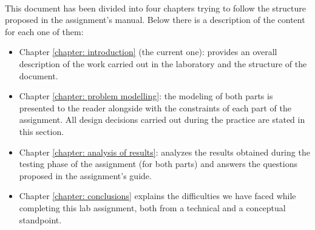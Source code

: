 \paragraph{}
This document has been divided into four chapters trying to follow the structure proposed in the assignment's manual. Below there is a description of the content for each one of them:
\begin{itemize}
    \item[] Chapter \ref{chapter: introduction} (the current one): provides an overall description of the work carried out in the laboratory and the structure of the document.
    
    \item[] Chapter \ref{chapter: problem modelling}: the modeling of both parts is presented to the reader alongside with the constraints of each part of the assignment. All design decisions carried out during the practice are stated in this section.
    
    \item[] Chapter \ref{chapter: analysis of results}: analyzes the results obtained during the testing phase of the assignment (for both parts) and answers the questions proposed in the assignment's guide. 
    
    \item[] Chapter \ref{chapter: conclusions} explains the difficulties we have faced while completing this lab assignment, both from a technical and a conceptual standpoint.
\end{itemize}